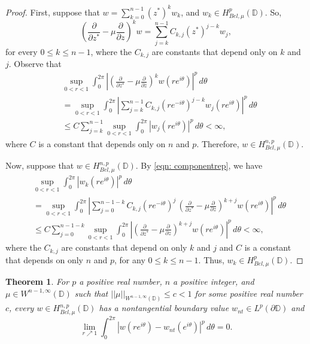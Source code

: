 \documentclass[12pt,reqno]{amsart}
\newtheorem{theorem}{Theorem}[section]
\theoremstyle{definition}
\theoremstyle{remark}
\newcommand{\p}{\partial}
\newcommand{\disk}{\mathbb{D}}
\begin{document}
\begin{proof}



First, suppose that $w = \sum_{k=0}^{n-1}(z^*)^k w_k$, and $w_k \in H^{p}_{Bel,\mu}(\disk)$. So, 
\[
     \left(\frac{\p }{\p z^*}- \mu\frac{\p}{\p z}\right)^k  w = \sum_{j = k}^{n-1} C_{k,j} (z^*)^{j-k} w_j,
\]
for every $0 \leq k \leq n-1$, where the $C_{k,j}$ are constants that depend only on $k$ and $j$. Observe that
\begin{align*}
    & \sup_{0 < r <1} \int_0^{2\pi} \left|  \left(\frac{\p }{\p z^*}- \mu\frac{\p}{\p z}\right)^k  w(re^{i\theta})  \right|^p \,d\theta \\
    &= \sup_{0 < r <1} \int_0^{2\pi} \left| \sum_{j = k}^{n-1} C_{k,j} (re^{-i\theta})^{j-k} w_j(re^{i\theta})  \right|^p \,d\theta \\
    &\leq C \sum_{j = k}^{n-1} \sup_{0 < r < 1 } \int_0^{2\pi} \left|w_j(re^{i\theta})  \right|^p \,d\theta < \infty,
\end{align*}
where $C$ is a constant that depends only on $n$ and $p$. Therefore, $w \in H_{Bel,\mu}^{n,p}(\disk)$.



Now, suppose that $w \in H^{n,p}_{Bel,\mu}(\disk)$. By \eqref{eqn: componentrep}, we have
\begin{align*}
    &\sup_{0 < r <1} \int_0^{2\pi} \left| w_k(re^{i\theta})  \right|^p \,d\theta \\
    &= \sup_{0 < r <1} \int_0^{2\pi} \left|\sum_{j=0}^{n-1-k}C_{k,j}(re^{-i\theta})^j\, \left(\frac{\p}{\p z^*}-\mu\frac{\p}{\p z}\right)^{k+j}w(re^{i\theta})  \right|^p \,d\theta \\
    &\leq C \sum_{j=0}^{n-1-k}\sup_{0 < r < 1} \int_0^{2\pi} \left| \left(\frac{\p}{\p z^*}-\mu\frac{\p}{\p z}\right)^{k+j}w(re^{i\theta})  \right|^p \,d\theta < \infty,
\end{align*}
 where the $C_{k,j}$ are constants that depend on only $k$ and $j$ and $C$ is a constant that depends on only $n$ and $p$, for any $0 \leq k \leq n-1$. Thus, $w_k \in H^p_{Bel,\mu}(\disk)$.

\end{proof}

\begin{theorem}For $p$ a positive real number, $n$ a positive integer, and $\mu \in W^{n-1,\infty}(\disk)$ such that $||\mu||_{W^{n-1,\infty}(\disk)}\leq c < 1$ for some positive real number $c$, every $w \in H^{n,p}_{Bel,\mu}(\disk)$ has a nontangential boundary value $w_{nt} \in L^p(\p \disk)$ and 
\[
    \lim_{r\nearrow 1} \int_0^{2\pi} |w(re^{i\theta})- w_{nt}(e^{i\theta})|^p\,d\theta = 0.
\]

\end{theorem}
\end{document}
